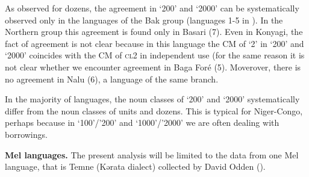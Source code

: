 \begin{table}
\caption{\label{tab:1:14} Agreement in `200' and `2000'}

\end{table}


As observed for dozens, the agreement in ‘200’ and ‘2000’ can be systematically observed only in the languages of the Bak group (languages 1-5 in ). In the Northern group this agreement is found only in Basari (7). Even in Konyagi, the fact of agreement is not clear because in this language the CM of ‘2’ in ‘200’ and ‘2000’ coincides with the CM of \textsc{cl}2 in independent use (for the same reason it is not clear whether we encounter agreement in Baga Foré (5). Moverover, there is no agreement in Nalu (6), a language of the same branch. 

In the majority of languages, the noun classes of ‘200’ and ‘2000’ systematically differ from the noun classes of units and dozens. This is typical for Niger-Congo, perhaps because in ‘100’/’200’ and ‘1000’/’2000’ we are often dealing with borrowings.

\textbf{Mel languages.} The present analysis will be limited to the data from one Mel language, that is Temne (Kərata dialect) collected by David Odden ().


